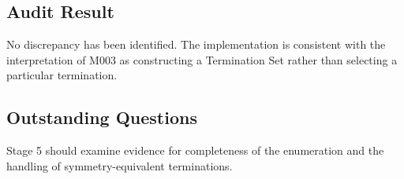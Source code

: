 \subsection{Audit Result}

No discrepancy has been identified. The implementation is consistent with
the interpretation of M003 as constructing a Termination Set rather than
selecting a particular termination.

\subsection{Outstanding Questions}

Stage 5 should examine evidence for completeness of the enumeration and
the handling of symmetry-equivalent terminations.
